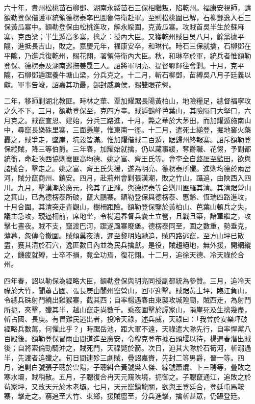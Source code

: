 \begin{pinyinscope}
六十年，貴州松桃苗石柳鄧、湖南永綏苗石三保相繼叛，陷乾州。福康安視師，請額勒登保偕護軍統領德楞泰率巴圖魯侍衛赴軍。至則松桃圍已解，石柳鄧逸入石三保黃瓜寨中。額勒登保由松桃進攻，解永綏圍，克黃瓜寨。攻賊首吳半生於蘇麻寨，克西梁；半生遁高多寨，擒之：授內大臣。又獲乾州賊目吳八月，餘黨據平隴，進抵長吉山，敗之。嘉慶元年，福康安卒，和琳代。時石三保就擒，石柳鄧在平隴，乃進兵復乾州，賜花翎，署領侍衛內大臣。秋，和琳卒於軍，統兵者惟額勒登保、德楞泰及湖南巡撫姜晟三人。詔將軍明亮、提督鄂輝往會剿。十月，克平隴，石柳鄧遁踞養牛塘山梁，分兵克之。十二月，斬石柳鄧，苗縛吳八月子廷義以獻。軍事告竣，詔嘉其功最，錫封威勇侯，賜雙眼花翎。

二年，移師剿湖北教匪。時林之華、覃加耀踞長陽黃柏山，地險糧足，總督福寧攻之久不下。三月，額勒登保至，克四方臺。賊遁鶴峰芭葉山，其險隘曰大拏口，六月克之。賊竄宣恩、建始，分兵三路進，十月，斃之華於大茅田，而加耀遁施南山中，尋竄長樂硃里寨，三面懸崖，惟東南一徑。十二月，遣死士縋登，掘地窖火藥轟之，賊爭走，墜崖，坑穀皆滿。惟加耀偕賊二百遁，踞歸州終報寨。詔斥額勒登保縱賊，降三等伯爵。三年春，加耀始就擒，仍以蕆事緩，奪爵職、花翎，予副都統銜，命赴陜西協剿襄匪高均德、姚之富、齊王氏等。會李全自盩厔至藍田，欲與諸賊合，擊走之。姚之富、齊王氏失援，遂為明亮、德楞泰所殲。進剿均德於兩岔河，賊分竄商州、鎮安。四月，赴荊州會剿張漢潮，敗之竹山，躡追，由陜西入四川。九月，擊漢潮於廣元，擒其子正漋。與德楞泰等合剿川匪羅其清。其清踞營山之箕山，已為德楞泰所破，竄大鵬寨。額勒登保與德楞泰、惠齡、恆瑞四路進攻，十月合圍。其清突走青觀山，樹柵距險。額勒登保鑒於黃柏山、芭葉山頓兵之失，議主急攻，親逼柵前，席地坐，令楊遇春督兵囊土立營，且戰且築，諸軍繼之，攻擊七晝夜。賊不支，竄渡巴河，踞遂風寨廢堡。德楞泰同至，圍之數重，勢垂克，薄暮，忽傳令撤圍。賊傾巢夜潰，遲至黎明始馳追，賊四路逃竄，至方山坪已散盡，獲其清於石穴，逸匪數日內並為民兵擒獻。是役，賊趨絕地，無外援，開網縱之，饑疲就縛，士卒不損，竟全功焉，復花翎。十二月，追徐天德、冷天祿於合州。

四年春，詔以勒保為經略大臣，額勒登保與明亮同授副都統為參贊。三月，追冷天祿於大竹，聞蕭占國、張長庚由閬州竄營山，回軍迎擊。賊踞黃土坪，臨江負山，令總兵硃射鬥繞出雞猴寨，截其西；自率楊遇春由東襲攻城隍廟，賊西走，為射鬥所扼，夾擊，殲其半，越山竄走尚數千。乘夜圍擊於譚家山，隕崖死及生擒幾盡，斬占國、長庚。有冒難民逃出者，投冷天祿，述兵威，天祿曰：「我曾於安樂坪破經略兵數萬，何懼此乎？」時踞岳池，距大軍不遠，天祿遣大隊先行，自率悍黨八百殿後。額勒登保冒雨由間道進至廣安，令穆克登布據石頭堰以待，楊遇春潛出賊後；自將索倫勁騎沖之，賊死鬥，天祿斃於箭。次日，迫其大隊於石筍河，斬溺過半，先渡者追殲之。旬日間連殄三劇賊，疊詔嘉賚，先封二等男爵，晉一等。四月，追剿白號張子聰於雲陽，子聰糾合黃號樊人傑、線號蕭焜、卜三聘等，疊敗之寒水壩，賊稍散。五月，子聰復合冉天元窺陜境，扼御之。子聰竄通江，追敗之於茍家坪，又敗天元於木老壩。七月，天元竄鎮龍關，欲與王登廷合，登廷屯馬鞍寨，擊走之。窮追至大竹、東鄉，援賊麕至，分兵進擊，擒斬甚眾，仍躡登廷。


\end{pinyinscope}
